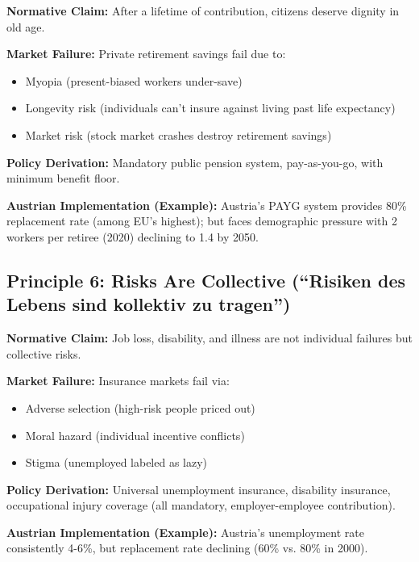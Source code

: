 \begin{tcolorbox}[colback=gray!5!white, colframe=gray!75!black,
    title=Principle BF-5: Pension Guarantee]

\textbf{Normative Claim:} After a lifetime of contribution, citizens deserve dignity in old age.

\textbf{Market Failure:} Private retirement savings fail due to:
\begin{itemize}[nosep]
\item Myopia (present-biased workers under-save)
\item Longevity risk (individuals can't insure against living past life expectancy)
\item Market risk (stock market crashes destroy retirement savings)
\end{itemize}

\textbf{Policy Derivation:} Mandatory public pension system, pay-as-you-go, with minimum benefit floor.

\textbf{Austrian Implementation (Example):} Austria's PAYG system provides 80\% replacement rate (among EU's highest); but faces demographic pressure with 2 workers per retiree (2020) declining to 1.4 by 2050.

\end{tcolorbox}


\subsection{Principle 6: Risks Are Collective (``Risiken des Lebens sind kollektiv zu tragen'')}

\begin{tcolorbox}[colback=gray!5!white, colframe=gray!75!black,
    title=Principle BF-6: Collective Insurance]

\textbf{Normative Claim:} Job loss, disability, and illness are not individual failures but collective risks.

\textbf{Market Failure:} Insurance markets fail via:
\begin{itemize}[nosep]
\item Adverse selection (high-risk people priced out)
\item Moral hazard (individual incentive conflicts)
\item Stigma (unemployed labeled as lazy)
\end{itemize}

\textbf{Policy Derivation:} Universal unemployment insurance, disability insurance, occupational injury coverage (all mandatory, employer-employee contribution).

\textbf{Austrian Implementation (Example):} Austria's unemployment rate consistently 4-6\%, but replacement rate declining (60\% vs. 80\% in 2000).

\end{tcolorbox}

